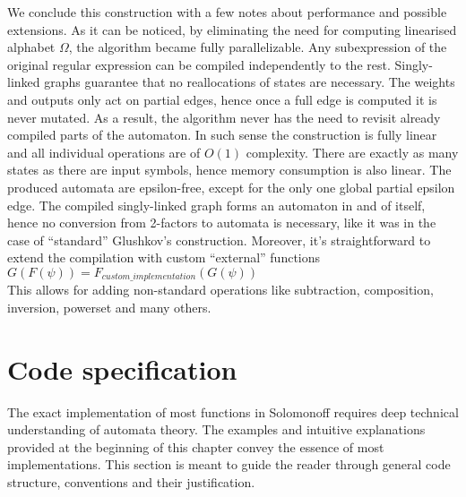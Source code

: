 We conclude this construction with a few notes about performance and possible extensions. As it can be noticed, by eliminating the need for computing linearised alphabet $\Omega$, the algorithm became fully parallelizable. Any subexpression of the original regular expression can be compiled independently to the rest. Singly-linked graphs guarantee that no reallocations of states are necessary. The weights and outputs only act on partial edges, hence once a full edge is computed it is never mutated. As a result, the algorithm never has the need to revisit already compiled parts of the automaton. In such sense the construction is fully linear and all individual operations are of $O(1)$ complexity. There are exactly as many states as there are input symbols, hence memory consumption is also linear. The produced automata are epsilon-free, except for the only one global partial epsilon edge. The compiled singly-linked graph forms an automaton in and of itself, hence no conversion from 2-factors to automata is necessary, like it was in the case of ``standard'' Glushkov's construction. Moreover, it's straightforward to extend the compilation with custom ``external'' functions \\
$G(F(\psi)) = F_{custom\_implementation}(G(\psi))$ \\
This allows for adding non-standard operations like subtraction, composition, inversion, powerset and many others.













\section{Code specification}

The exact implementation of most functions in Solomonoff requires deep technical understanding of automata theory. The examples and intuitive explanations provided at the beginning of this chapter convey the essence of most implementations. This section is meant to guide the reader through general code structure, conventions and their justification. 

